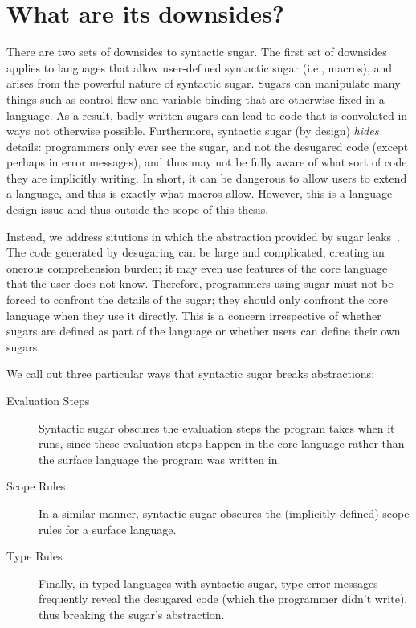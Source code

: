 \section{What are its downsides?}

There are two sets of downsides to syntactic sugar. The first
set of downsides applies to languages that allow user-defined
syntactic sugar (i.e., macros), and arises from the powerful nature of
syntactic sugar. Sugars can manipulate many things
such as control flow and variable binding that are otherwise fixed in
a language. As a result, badly written sugars can lead to code that is
convoluted in ways not otherwise possible.  Furthermore, syntactic
sugar (by design) \emph{hides} details: programmers only ever see the
sugar, and not the desugared code (except perhaps in error messages),
and thus may not be fully aware of what sort of code they are implicitly
writing. In short, it can be dangerous to allow users to extend a
language, and this is exactly what macros allow. However, this is a
language design issue and thus outside the scope of this thesis.

Instead, we address situtions in which the abstraction provided by
sugar leaks~\cite{leaky-abstractions}. The code
generated by desugaring can be large and complicated, creating an
onerous comprehension burden; it may even use features of the core
language that the user does not know. Therefore, programmers using
sugar must not be forced to confront the details of the sugar; they should
only confront the core language when they use it directly. This is a
concern irrespective of whether sugars are defined as part of the
language or whether users can define their own sugars.

We call out three particular ways that syntactic sugar breaks abstractions:

\begin{description}
\item[Evaluation Steps] Syntactic sugar obscures the evaluation steps
  the program takes when it runs, since these evaluation steps happen
  in the core language rather than the surface language the program
  was written in.
\item[Scope Rules] In a similar manner, syntactic sugar obscures the
  (implicitly defined) scope rules for a surface language.
\item[Type Rules] Finally, in typed languages with syntactic sugar,
  type error messages frequently reveal the desugared code (which the
  programmer didn't write), thus breaking the sugar's abstraction.
\end{description}

